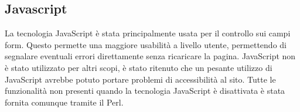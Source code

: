 \subsection{Javascript}
La tecnologia JavaScript \`e stata principalmente usata per il controllo sui campi form. Questo permette una maggiore usabilit\`a a livello utente, permettendo di segnalare eventuali errori direttamente senza ricaricare la pagina.
JavaScript non \`e stato utilizzato per altri scopi, \`e stato ritenuto che un pesante utilizzo di JavaScript avrebbe potuto portare problemi di accessibilit\`a al sito. Tutte le funzionalit\`a non presenti quando la tecnologia JavaScript \`e disattivata \`e stata fornita comunque tramite il Perl.
